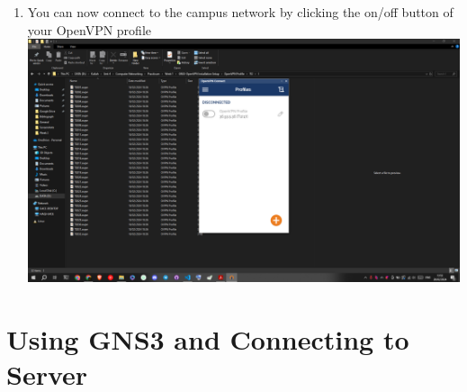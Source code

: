 \documentclass[12pt,titlepage]{article}
\begin{document}
\begin{enumerate}
    \item You can now connect to the campus network by clicking the on/off button of your OpenVPN profile \\ \includegraphics[width=.9\textwidth]{images/figures/Screenshot (455).png}
\end{enumerate}

\newpage

\section{Using GNS3 and Connecting to Server}
\end{document}
